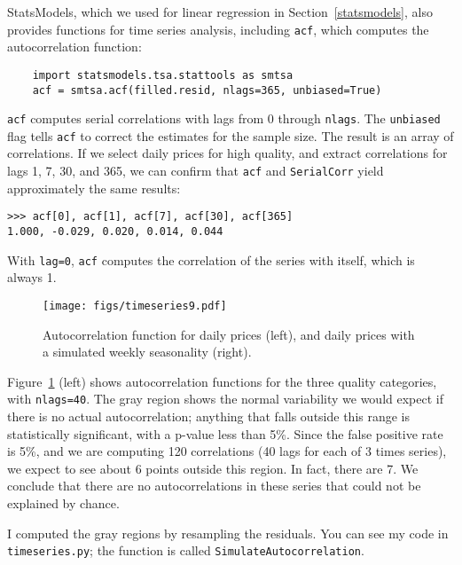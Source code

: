 StatsModels, which we used for linear regression in
Section~\ref{statsmodels}, also provides functions for time series
analysis, including {\tt acf}, which computes the autocorrelation
function:

\begin{verbatim}
    import statsmodels.tsa.stattools as smtsa
    acf = smtsa.acf(filled.resid, nlags=365, unbiased=True)
\end{verbatim}

{\tt acf} computes serial correlations with
lags from 0 through {\tt nlags}.  The {\tt unbiased} flag tells
{\tt acf} to correct the estimates for the sample size.  The result
is an array of correlations.  If we select daily prices for high
quality, and extract correlations for lags 1, 7, 30, and 365, we can
confirm that {\tt acf} and {\tt SerialCorr} yield approximately
the same results:

\begin{verbatim}
>>> acf[0], acf[1], acf[7], acf[30], acf[365]
1.000, -0.029, 0.020, 0.014, 0.044
\end{verbatim}

With {\tt lag=0}, {\tt acf} computes the correlation of the series
with itself, which is always 1.

\begin{figure}
\centerline{\texttt{[image: figs/timeseries9.pdf]}}
\caption{Autocorrelation function for daily prices (left), and
daily prices with a simulated weekly seasonality (right).}
\label{timeseries9}
\end{figure}

Figure~\ref{timeseries9} (left) shows autocorrelation functions for
the three quality categories, with {\tt nlags=40}.  The gray region
shows the normal variability we would expect if there is no actual
autocorrelation; anything that falls outside this range is
statistically significant, with a p-value less than 5\%.  Since
the false positive rate is 5\%, and
we are computing 120 correlations (40 lags for each of 3 times series),
we expect to see about 6 points outside this region.  In fact, there
are 7.  We conclude that there are no autocorrelations
in these series that could not be explained by chance.
   

I computed the gray regions by resampling the residuals.  You
can see my code in {\tt timeseries.py}; the function is called
{\tt SimulateAutocorrelation}.

